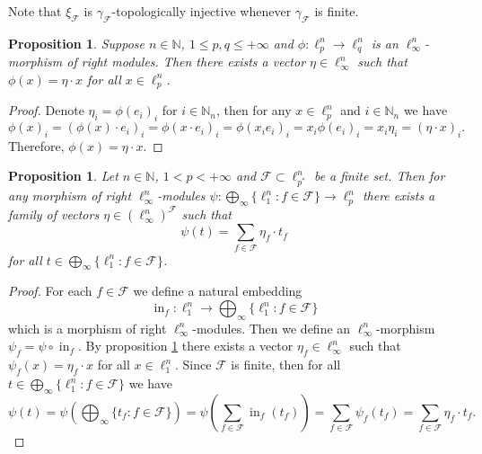 \documentclass[12pt]{article}
\newtheorem{proposition}[theorem]{Proposition}
\begin{document}
Note that $\xi_{\mathcal{F}}$ is $\gamma_{\mathcal{F}}$-topologically injective
whenever $\gamma_{\mathcal{F}}$ is finite.

\begin{proposition}\label{LinfnMorphlpntolqnCharac}
    Suppose $n\in\mathbb{N}$, $1\leq p,q\leq +\infty$ 
    and $\phi:\ell_{p}^n\to \ell_{q}^n$ is an $\ell_{\infty}^n$-morphism of 
    right modules. Then there exists a vector $\eta\in\ell_{\infty}^n$ such 
    that $\phi(x)=\eta\cdot x$ for all $x\in \ell_{p}^n$.
\end{proposition}
\begin{proof}
    Denote $\eta_i=\phi(e_i)_i$ for $i\in\mathbb{N}_n$, then for 
    any $x\in\ell_{p}^n$ and $i\in\mathbb{N}_n$ we have
    \[
        \phi(x)_i
        =(\phi(x)\cdot e_i)_i
        =\phi(x\cdot e_i)_i
        =\phi(x_i e_i)_i
        =x_i\phi(e_i)_i
        =x_i\eta_i
        =(\eta\cdot x)_i.
    \]
    Therefore, $\phi(x)=\eta\cdot x$.
\end{proof}

\begin{proposition}\label{ExtMorphSuml1ntlpnCharac}
    Let $n\in\mathbb{N}$, $1<p<+\infty$ and $\mathcal{F}\subset \ell_{p^*}^n$
    be a finite set. Then for any morphism of right $\ell_{\infty}^n$-modules
    $\psi:\bigoplus_{\infty}\{\ell_1^n : f\in\mathcal{F}\}\to\ell_p^n$ 
    there exists a family of vectors $\eta\in(\ell_{\infty}^n)^\mathcal{F}$ 
    such that
    \[
        \psi(t)=\sum_{f\in\mathcal{F}} \eta_f \cdot t_f
    \]
    for all $t\in \bigoplus_{\infty}\{ \ell_1^n:f\in\mathcal{F}\}$.
\end{proposition}
\begin{proof}
    For each $f\in\mathcal{F}$  we define a natural embedding
    \[
        \operatorname{in}_f:
        \ell_1^n\to \bigoplus_\infty\{ \ell_1^n : f\in\mathcal{F}\}
    \]
    which is a morphism of right $\ell_{\infty}^n$-modules. Then we define 
    an $\ell_{\infty}^n$-morphism $\psi_f=\psi\circ \operatorname{in}_f$. 
    By proposition \ref{LinfnMorphlpntolqnCharac} there exists 
    a vector $\eta_f\in\ell_{\infty}^n$ such that $\psi_f(x)=\eta_f\cdot x$ 
    for all $x\in\ell_1^n$. Since $\mathcal{F}$ is finite, then for 
    all $t\in \bigoplus_\infty\{ \ell_1^n : f\in \mathcal{F}\}$ we have
    \[
        \psi(t)
        =\psi\left(\bigoplus_\infty\{ t_f : f\in\mathcal{F}\}\right)
        =\psi\left(\sum_{f\in\mathcal{F}} \operatorname{in}_f(t_f)\right)
        =\sum_{f\in\mathcal{F}}\psi_f(t_f)
        =\sum_{f\in\mathcal{F}} \eta_f\cdot t_f.
    \]
\end{proof}
\end{document}
